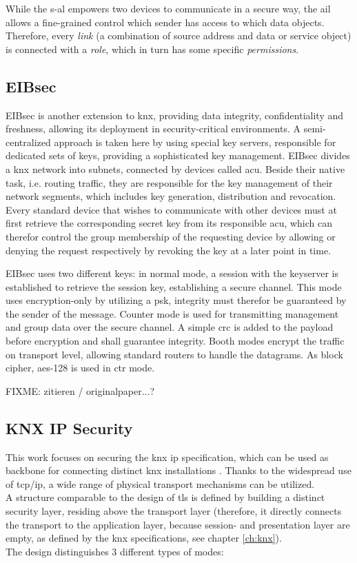While the \gls{s-al} empowers two devices to communicate in a secure way, the \gls{ail} allows a fine-grained control which sender has access to which
data objects. Therefore, every \textit{link} (a combination of source address and data or service object) is connected with a \textit{role}, which in turn
has some specific \textit{permissions}. 

\subsection{EIBsec}

EIBsec is another extension to \gls{knx}, providing data integrity, confidentiality and freshness, allowing its deployment in security-critical environments.
A semi-centralized approach is taken here by using special key servers, responsible for dedicated sets
of keys, providing a sophisticated key management. EIBsec divides a \gls{knx} network into subnets, connected by devices called \gls{acu}. Beside their native
task, i.e. routing traffic, they
 are responsible for the key management of their network segments, which includes key generation, distribution and revocation. Every standard device that
 wishes to communicate with other devices must at first retrieve the corresponding secret key from its responsible \gls{acu}, which can therefor control the
 group membership of the requesting device by allowing or denying the request respectively by revoking the key at a later point in time.

EIBsec uses two different keys: in normal mode, a session with the keyserver is established to retrieve the session key, establishing a secure channel.
This mode uses encryption-only by utilizing a \gls{psk}, integrity must therefor be guaranteed by the sender of the message. Counter mode is used for transmitting management and
group data over the secure channel. A simple \gls{crc} is added to the payload before encryption and shall guarantee integrity. Booth modes encrypt the traffic
on transport level, allowing standard routers to handle the datagrams. As block cipher, \gls{aes}-128 is used in \gls{ctr} mode.

FIXME: zitieren / originalpaper...?

\subsection{KNX IP Security}

This work focuses on securing the \gls{knx} \gls{ip} specification, which can be used as backbone for connecting distinct \gls{knx} installations \cite{5195839}.
Thanks to the widespread use of \gls{tcp}/\gls{ip}, a wide range of physical transport mechanisms can be utilized.
\\
A structure comparable to the design of \gls{tls} is defined by building a distinct security layer, residing above the transport layer (therefore, it directly
connects the transport to the application layer, because session- and presentation layer are empty, as defined by the \gls{knx} specifications, see chapter
\ref{ch:knx}).
\\
The design distinguishes 3 different types of modes: 

